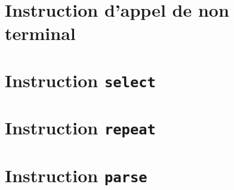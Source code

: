 \section{Instruction d'appel de non terminal}





\section{Instruction \texttt{select}}








\section{Instruction \texttt{repeat}}







\section{Instruction \texttt{parse}}











